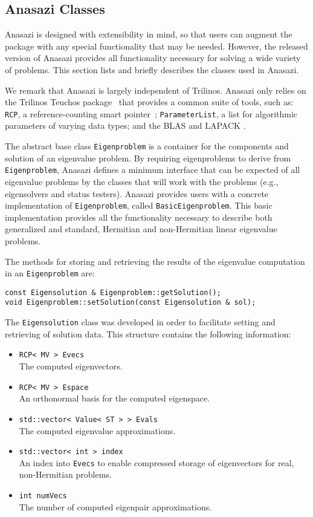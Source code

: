 \documentclass[acmtoms]{acmtrans2m}
\newcounter{algorithm}
\newcommand{\aspace}[1]{\texttt{#1}}
\begin{document}
\subsection{Anasazi Classes}
\label{subsec:anasazi:classes}

Anasazi is designed with extensibility in mind, so that users can
augment the package with any special functionality that may be
needed. However, the released version of Anasazi provides all
functionality necessary for solving a wide variety of problems. This
section lists and briefly describes the classes used in Anasazi.


We remark that Anasazi is largely independent of Trilinos. Anasazi
only relies on the Trilinos Teuchos package~\cite{Trilinos:Teuchos}
that provides a common suite of tools, such as: \texttt{RCP},
a reference-counting smart pointer~\cite{detlefs92garbage};
\texttt{ParameterList}, a list for algorithmic parameters of
varying data types; and the BLAS
\cite{Lawson:1979:BLA,Blackford:2002:USB} and LAPACK \cite{abbd:95}.

The abstract base class \aspace{Eigenproblem} is a container for the components and
solution of an eigenvalue problem. By requiring eigenproblems to derive from
\aspace{Eigenproblem}, Anasazi defines a minimum interface that can be expected of all
eigenvalue problems by the classes that will work with the problems (e.g., eigensolvers
and status testers). Anasazi provides users with a concrete implementation of
\aspace{Eigenproblem}, called \aspace{BasicEigenproblem}. This basic implementation
provides all the functionality necessary to describe both generalized and standard,
Hermitian and non-Hermitian linear eigenvalue problems.

The methods for storing and retrieving the results of the
eigenvalue computation in an \aspace{Eigenproblem} are:
\begin{verbatim}
const Eigensolution & Eigenproblem::getSolution();
void Eigenproblem::setSolution(const Eigensolution & sol);
\end{verbatim}

The \aspace{Eigensolution} class was developed in order to
facilitate setting and retrieving of solution data. This structure
contains the following information:
\begin{itemize}
  \item \verb!RCP< MV > Evecs! \\
   The computed eigenvectors.
 \item \verb!RCP< MV > Espace! \\
   An orthonormal basis for the computed eigenspace.
 \item \verb!std::vector< Value< ST > > Evals! \\
   The computed eigenvalue approximations.
 \item \verb!std::vector< int > index! \\
   An index into \verb!Evecs! to enable compressed storage of eigenvectors for real, non-Hermitian problems.
 \item \verb!int numVecs! \\
   The number of computed eigenpair approximations.
\end{itemize}
\end{document}
